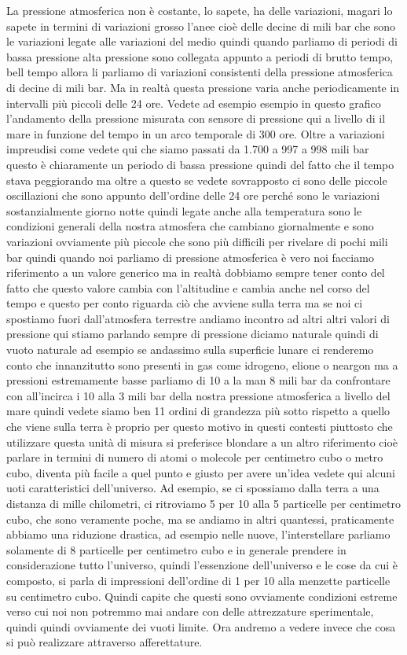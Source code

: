 La pressione atmosferica non è costante, lo sapete, ha delle variazioni, magari lo sapete in termini di variazioni grosso l'anee cioè delle decine di mili bar che sono le variazioni legate alle variazioni del medio quindi quando parliamo di periodi di bassa pressione alta pressione sono collegata appunto a periodi di brutto tempo, bell tempo allora li parliamo di variazioni consistenti della pressione atmosferica di decine di mili bar. Ma in realtà questa pressione varia anche periodicamente in intervalli più piccoli delle 24 ore. Vedete ad esempio esempio in questo grafico l'andamento della pressione misurata con sensore di pressione qui a livello di il mare in funzione del tempo in un arco temporale di 300 ore. Oltre a variazioni impreudisi come vedete qui che siamo passati da 1.700 a 997 a 998 mili bar questo è chiaramente un periodo di bassa pressione quindi del fatto che il tempo stava peggiorando ma oltre a questo se vedete sovrapposto ci sono delle piccole oscillazioni che sono appunto dell'ordine delle 24 ore perché sono le variazioni sostanzialmente giorno notte quindi legate anche alla temperatura sono le condizioni generali della nostra atmosfera che cambiano giornalmente e sono variazioni ovviamente più piccole che sono più difficili per rivelare di pochi mili bar quindi quando noi parliamo di pressione atmosferica è vero noi facciamo riferimento a un valore generico ma in realtà dobbiamo sempre tener conto del fatto che questo valore cambia con l'altitudine e cambia anche nel corso del tempo e questo per conto riguarda ciò che avviene sulla terra ma se noi ci spostiamo fuori dall'atmosfera terrestre andiamo incontro ad altri altri valori di pressione qui stiamo parlando sempre di pressione diciamo naturale quindi di vuoto naturale ad esempio se andassimo sulla superficie lunare ci renderemo conto che innanzitutto sono presenti in gas come idrogeno, elione o neargon ma a pressioni estremamente basse parliamo di 10 a la man 8 mili bar da confrontare con all'incirca i 10 alla 3 mili bar della nostra pressione atmosferica a livello del mare quindi vedete siamo ben 11 ordini di grandezza più sotto rispetto a quello che viene sulla terra è proprio per questo motivo in questi contesti piuttosto che utilizzare questa unità di misura si preferisce blondare a un altro riferimento cioè parlare in termini di numero di atomi o molecole per centimetro cubo o metro cubo, diventa più facile a quel punto e giusto per avere un'idea vedete qui alcuni uoti caratteristici dell'universo. Ad esempio, se ci spossiamo dalla terra a una distanza di mille chilometri, ci ritroviamo 5 per 10 alla 5 particelle per centimetro cubo, che sono veramente poche, ma se andiamo in altri quantessi, praticamente abbiamo una riduzione drastica, ad esempio nelle nuove, l'interstellare parliamo solamente di 8 particelle per centimetro cubo e in generale prendere in considerazione tutto l'universo, quindi l'essenzione dell'universo e le cose da cui è composto, si parla di impressioni dell'ordine di 1 per 10 alla menzette particelle su centimetro cubo. Quindi capite che questi sono ovviamente condizioni estreme verso cui noi non potremmo mai andare con delle attrezzature sperimentale, quindi quindi ovviamente dei vuoti limite. Ora andremo a vedere invece che cosa si può realizzare attraverso afferettature. 